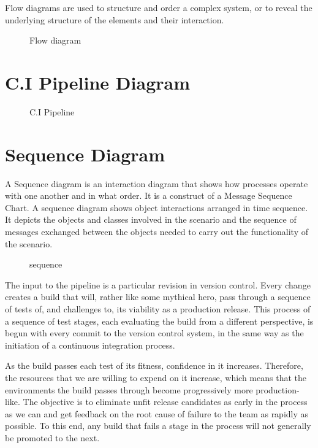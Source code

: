 \documentclass[12pt,a4paper,oneside]{report}
\begin{document}
{Flow diagrams are used to structure and order a complex system, or to reveal the underlying structure of the elements and their interaction.
\begin{figure}[h]
\begin{center}

\hspace{.0 in}
\caption{Flow diagram}
\end{center}

\end{figure}
\pagebreak
\section{C.I Pipeline Diagram}
\begin{figure}[h]
\begin{center}

\hspace{.0 in}
\caption{C.I Pipeline}
\end{center}

\end{figure}
\pagebreak
\section{Sequence Diagram}
\par A Sequence diagram is an interaction diagram that shows how processes operate with
one another and in what order. It is a construct of a Message Sequence Chart. A sequence
diagram shows object interactions arranged in time sequence. It depicts the objects and classes
involved in the scenario and the sequence of messages exchanged between the objects needed
to carry out the functionality of the scenario.
\begin{figure}[h]
\begin{center}

\hspace{.0 in}
\caption{sequence}
\end{center}

\end{figure}
\par
The input to the pipeline is a particular revision in version control. Every change creates a build that will, rather like some mythical hero, pass through a sequence of tests of, and challenges to, its viability as a production release. This process of a sequence of test stages, each evaluating the build from a different perspective, is begun with every commit to the version control system, in the same way as the initiation of a continuous integration process.
\par
As the build passes each test of its fitness, confidence in it increases. Therefore, the resources that we are willing to expend on it increase, which means that the environments the build passes through become progressively more production-like. The objective is to eliminate unfit release candidates as early in the process as we can and get feedback on the root cause of failure to the team as rapidly as possible. To this end, any build that fails a stage in the process will not generally be promoted to the next.
}
\end{document}
